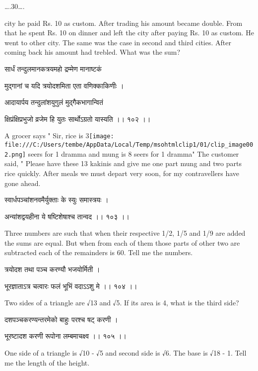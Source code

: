 \documentclass[]{article}
\date{}
\begin{document}
{\ldots{}.30\ldots{}.}

{city he paid Rs. 10 as custom. After trading his amount became double.
From that he spent Rs. 10 on dinner and left the city after paying Rs.
10 as custom. He went to other city. The same was the case in second and
third cities. After coming back his amount had trebled. What was the
sum?}

{सार्धं तन्दुलमानकत्रयमहो द्रम्मेण मानाष्टकं }

{मुद्गानां च यदि त्रयोदशमिता एता वणिक्काकिणीः । }

{आदायार्पय तन्दुलांशयुगुलं मुद्गैकभागान्वितं }

{क्षिप्रंक्षिप्रभुजो व्रजेम हि युतः सार्थोऽग्रतो यास्यति ।। १०२ ।। }

{A grocer says " Sir, rice is
3}\texttt{[image: file:///C:/Users/tembe/AppData/Local/Temp/msohtmlclip1/01/clip\_image002.png]}{
seers for 1 dramma and mung is 8 seers for 1 dramma" The customer said,
" Please have these 13 kakinis and give me one part mung and two parts
rice quickly. After meals we must depart very soon, for my
co}{n}{travellers have gone ahead.}

{स्वार्धपञ्चांशनवमैर्युक्ताः के स्युः समास्त्रयः । }

{अन्यांशद्वयहीना ये षष्टिशेषाश्च तान्वद ।। १०३ ।। }

{Three numbers are such that when their respective 1/2, 1/5 and 1/9 are
added the sums are equal. But when from each of them those parts of
other two are subtracted each of the remainders is 60. Tell me the
numbers.}

{त्रयोदश तथा पञ्च करण्यौ भजयोर्मिती । }

{भूरज्ञाताऽत्र चत्वारः फलं भूभिं वदाऽऽशु मे ।। १०४ ।। }

{Two sides of a triangle are }{√}{13 and }{√}{5. If its area is 4, what
is the third side?}

{दशपञ्चकरण्यन्तरमेको बाहुः परश्च षट् करणी । }

{भूरष्टादश करणी रूपोना लम्बमाचक्ष्व ।। १०५ ।। }

{One side of a triangle is }{√}{10 - }{√}{5 and second side is }{√}{6.
The base is }{√}{18 - 1. Tell me the length of the height.}
\end{document}
